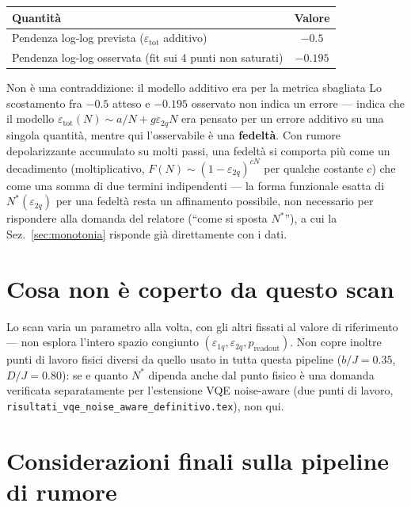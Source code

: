 \documentclass[11pt,a4paper]{article}
\begin{document}
\begin{center}
\renewcommand{\arraystretch}{1.2}
\begin{tabular}{@{}lc@{}}
\toprule
\textbf{Quantità} & \textbf{Valore}\\
\midrule
Pendenza log-log prevista ($\varepsilon_\text{tot}$ additivo) & $-0.5$\\
Pendenza log-log osservata (fit sui 4 punti non saturati) & $-0.195$\\
\bottomrule
\end{tabular}
\end{center}

\begin{okbox}{Non è una contraddizione: il modello additivo era per la
metrica sbagliata}
Lo scostamento fra $-0.5$ atteso e $-0.195$ osservato non indica un
errore --- indica che il modello $\varepsilon_\text{tot}(N)\sim a/N+g\varepsilon_{2q}N$
era pensato per un errore additivo su una singola quantità, mentre qui
l'osservabile è una \textbf{fedeltà}. Con rumore depolarizzante
accumulato su molti passi, una fedeltà si comporta più come un
decadimento (moltiplicativo, $F(N)\sim(1-\varepsilon_{2q})^{cN}$ per
qualche costante $c$) che come una somma di due termini indipendenti ---
la forma funzionale esatta di $N^*(\varepsilon_{2q})$ per una fedeltà
resta un affinamento possibile, non necessario per rispondere alla
domanda del relatore (``come si sposta $N^*$''), a cui la
Sez.~\ref{sec:monotonia}
risponde già direttamente con i dati.
\end{okbox}

\section{Cosa non è coperto da questo scan}

Lo scan varia un parametro alla volta, con gli altri fissati al valore
di riferimento --- non esplora l'intero spazio congiunto
$(\varepsilon_{1q},\varepsilon_{2q},p_\text{readout})$. Non copre inoltre
punti di lavoro fisici diversi da quello usato in tutta questa pipeline
($b/J=0.35$, $D/J=0.80$): se e quanto $N^*$ dipenda anche dal punto
fisico è una domanda verificata separatamente per l'estensione VQE
noise-aware (due punti di lavoro, \texttt{risultati\_vqe\_noise\_aware\_definitivo.tex}),
non qui.

\section{Considerazioni finali sulla pipeline di rumore}
\end{document}
